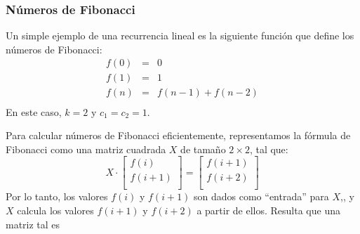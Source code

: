 \subsubsection{Números de Fibonacci}


Un simple ejemplo de una recurrencia lineal es la siguiente función que define
los números de Fibonacci:
\[
    \begin{array}{lcl}
        f(0) & = & 0             \\
        f(1) & = & 1             \\
        f(n) & = & f(n-1)+f(n-2) \\
    \end{array}
\]
En este caso, $k=2$ y $c_1=c_2=1$.

Para calcular números de Fibonacci eficientemente, representamos la fórmula
de Fibonacci como una matriz cuadrada $X$ de tamaño $2 \times 2$, tal que:
\[ X \cdot
    \begin{bmatrix}
        f(i)   \\
        f(i+1) \\
    \end{bmatrix}
    =
    \begin{bmatrix}
        f(i+1) \\
        f(i+2) \\
    \end{bmatrix}
\]
Por lo tanto, los valores $f(i)$ y $f(i+1)$ son dados como ``entrada'' para
$X$,, y $X$ calcula los valores $f(i+1)$ y $f(i+2)$ a partir de ellos.
Resulta que una matriz tal es

